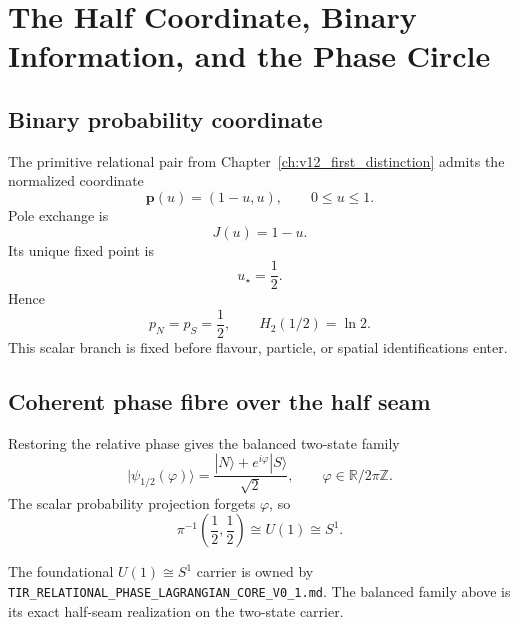 \chapter[Half Coordinate, Binary Information and Phase Circle]{The Half Coordinate, Binary Information, and the Phase Circle}
\label{ch:v12_half_ln2}

\section{Binary probability coordinate}

The primitive relational pair from Chapter~\ref{ch:v12_first_distinction} admits the normalized coordinate
\begin{equation}
\mathbf p(u)=(1-u,u),
\qquad
0\le u\le1.
\end{equation}
Pole exchange is
\begin{equation}
J(u)=1-u.
\end{equation}
Its unique fixed point is
\begin{equation}
\boxed{u_\star=\frac12.}
\label{eq:v12_half_point}
\end{equation}
Hence
\begin{equation}
p_N=p_S=\frac12,
\qquad
\boxed{H_2(1/2)=\ln2.}
\label{eq:v12_half_entropy}
\end{equation}
This scalar branch is fixed before flavour, particle, or spatial identifications enter.

\section{Coherent phase fibre over the half seam}

Restoring the relative phase gives the balanced two-state family
\begin{equation}
\boxed{
|\psi_{1/2}(\varphi)\rangle
=
\frac{|N\rangle+e^{i\varphi}|S\rangle}{\sqrt2},
\qquad
\varphi\in\mathbb R/2\pi\mathbb Z.
}
\label{eq:v12_half_fiber_state}
\end{equation}
The scalar probability projection forgets $\varphi$, so
\begin{equation}
\boxed{
\pi^{-1}\!\left(\frac12,\frac12\right)
\cong
U(1)
\cong
S^1.
}
\label{eq:v12_half_fiber}
\end{equation}

The foundational $U(1)\cong S^1$ carrier is owned by \texttt{TIR\_RELATIONAL\_PHASE\_LAGRANGIAN\_CORE\_V0\_1.md}. The balanced family above is its exact half-seam realization on the two-state carrier.

